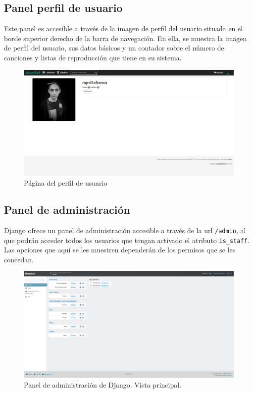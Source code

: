 \subsection{Panel perfil de usuario}

Este panel es accesible a través de la imagen de perfil del usuario situada en el borde superior derecho de la barra de navegación. En ella, se muestra la imagen de perfil del usuario, sus datos básicos y un contador sobre el número de canciones y listas de reproducción que tiene en su sistema.

\begin{figure}[H] 
\centering 
\includegraphics[scale=0.2]{../images/um/um_7.png}
\caption{Página del perfil de usuario}
\end{figure}

\subsection{Panel de administración}

Django ofrece un panel de administración accesible a través de la url \texttt{/admin}, al que podrán acceder todos los usuarios que tengan activado el atributo \texttt{is\_staff}. Las opciones que aquí se les muestren dependerán de los permisos que se les concedan. 

\begin{figure}[H] 
\centering 
\includegraphics[scale=0.2]{../images/um/um_8.png}
\caption{Panel de administración de Django. Vista principal.}
\end{figure}

